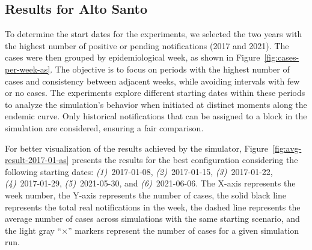 \subsection{Results for Alto Santo}

To determine the start dates for the experiments, we selected the two years with
the highest number of positive or pending notifications (2017 and 2021). The
cases were then grouped by epidemiological week, as shown in
Figure~\ref{fig:cases-per-week-as}. The objective is to focus on periods with
the highest number of cases and consistency between adjacent weeks, while
avoiding intervals with few or no cases. The experiments explore different
starting dates within these periods to analyze the simulation's behavior when
initiated at distinct moments along the endemic curve. Only historical
notifications that can be assigned to a block in the simulation are considered,
ensuring a fair comparison.

For better visualization of the results achieved by the simulator,
Figure~\ref{fig:avg-result-2017-01-as} presents the results for the best
configuration considering the following starting dates: \textit{(1)}~2017-01-08,
\textit{(2)}~2017-01-15, \textit{(3)}~2017-01-22, \textit{(4)}~2017-01-29,
\textit{(5)}~2021-05-30, and \textit{(6)}~2021-06-06. The X-axis represents the
week number, the Y-axis represents the number of cases, the solid black line
represents the total real notifications in the week, the dashed line represents
the average number of cases across simulations with the same starting scenario,
and the light gray ``$\times$'' markers represent the number of cases for a
given simulation run.

